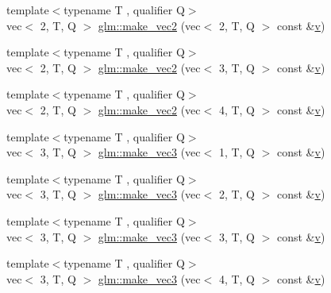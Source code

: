 \begin{DoxyCompactItemize}
\item 
{\footnotesize template$<$typename T , qualifier Q$>$ }\\vec$<$ 2, T, Q $>$ \mbox{\hyperlink{group__gtc__type__ptr_gae54bd325a08ad26edf63929201adebc7}{glm\+::make\+\_\+vec2}} (vec$<$ 2, T, Q $>$ const \&\mbox{\hyperlink{_s_d_l__opengl_8h_a10a82eabcb59d2fcd74acee063775f90}{v}})
\item 
{\footnotesize template$<$typename T , qualifier Q$>$ }\\vec$<$ 2, T, Q $>$ \mbox{\hyperlink{group__gtc__type__ptr_ga0084fea4694cf47276e9cccbe7b1015a}{glm\+::make\+\_\+vec2}} (vec$<$ 3, T, Q $>$ const \&\mbox{\hyperlink{_s_d_l__opengl_8h_a10a82eabcb59d2fcd74acee063775f90}{v}})
\item 
{\footnotesize template$<$typename T , qualifier Q$>$ }\\vec$<$ 2, T, Q $>$ \mbox{\hyperlink{group__gtc__type__ptr_ga2b81f71f3a222fe5bba81e3983751249}{glm\+::make\+\_\+vec2}} (vec$<$ 4, T, Q $>$ const \&\mbox{\hyperlink{_s_d_l__opengl_8h_a10a82eabcb59d2fcd74acee063775f90}{v}})
\item 
{\footnotesize template$<$typename T , qualifier Q$>$ }\\vec$<$ 3, T, Q $>$ \mbox{\hyperlink{group__gtc__type__ptr_ga9147e4b3a5d0f4772edfbfd179d7ea0b}{glm\+::make\+\_\+vec3}} (vec$<$ 1, T, Q $>$ const \&\mbox{\hyperlink{_s_d_l__opengl_8h_a10a82eabcb59d2fcd74acee063775f90}{v}})
\item 
{\footnotesize template$<$typename T , qualifier Q$>$ }\\vec$<$ 3, T, Q $>$ \mbox{\hyperlink{group__gtc__type__ptr_ga482b60a842a5b154d3eed392417a9511}{glm\+::make\+\_\+vec3}} (vec$<$ 2, T, Q $>$ const \&\mbox{\hyperlink{_s_d_l__opengl_8h_a10a82eabcb59d2fcd74acee063775f90}{v}})
\item 
{\footnotesize template$<$typename T , qualifier Q$>$ }\\vec$<$ 3, T, Q $>$ \mbox{\hyperlink{group__gtc__type__ptr_gacd57046034df557b8b1c457f58613623}{glm\+::make\+\_\+vec3}} (vec$<$ 3, T, Q $>$ const \&\mbox{\hyperlink{_s_d_l__opengl_8h_a10a82eabcb59d2fcd74acee063775f90}{v}})
\item 
{\footnotesize template$<$typename T , qualifier Q$>$ }\\vec$<$ 3, T, Q $>$ \mbox{\hyperlink{group__gtc__type__ptr_ga8b589ed7d41a298b516d2a69169248f1}{glm\+::make\+\_\+vec3}} (vec$<$ 4, T, Q $>$ const \&\mbox{\hyperlink{_s_d_l__opengl_8h_a10a82eabcb59d2fcd74acee063775f90}{v}})
\item 

\end{DoxyCompactItemize}

